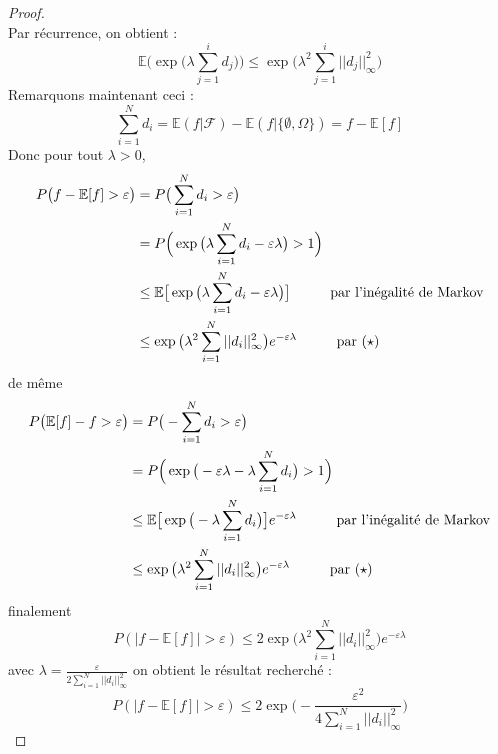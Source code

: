 \documentclass[12pt]{article}
\theoremstyle{definition}
\begin{document}
\begin{proof}
\begin{equation*}
	\end{equation*}
	Par récurrence, on obtient :
	\begin{equation*}\tag{$\star$}
	\mathbb{E}\Big(\exp\big(\lambda\sum_{j=1}^{i}d_j\big)\Big)\leq \exp\big(\lambda^2 \sum_{j=1}^{i}||d_j||_{\infty}^2\big)
	\end{equation*}
	Remarquons maintenant ceci : 
	\begin{equation*}
		\sum_{i=1}^{N}d_i = \mathbb{E}(f|\mathcal{F})-\mathbb{E}(f|\{\emptyset,\Omega\})=f-\mathbb{E}[f]
	\end{equation*}
	Donc pour tout $\lambda>0$,
	\begin{align*}
		P\big(f-\mathbb{E}[f]>\varepsilon\big)&=P\big(\sum_{i=1}^{N}d_i>\varepsilon\big)\\
		&=P\Big(\exp\big(\lambda\sum_{i=1}^{N}d_i-\varepsilon\lambda\big)>1\Big)\\
		&\leq \mathbb{E}\big[\exp\big(\lambda\sum_{i=1}^{N}d_i-\varepsilon\lambda\big)\big] \hspace{10mm} \text{par l'inégalité de Markov}\\
		&\leq \exp\big(\lambda^2 \sum_{i=1}^{N}||d_i||_{\infty}^2\big)e^{-\varepsilon\lambda}\hspace{10mm} \text{par ($\star$)}\\
	\end{align*}
	de même 
	\begin{align*}
		P\big(\mathbb{E}[f]-f>\varepsilon\big)&=P\big(-\sum_{i=1}^{N}d_i>\varepsilon\big)\\
		&=P\Big(\exp\big(-\varepsilon\lambda-\lambda\sum_{i=1}^{N}d_i\big)>1\Big)\\
		&\leq \mathbb{E}\big[\exp\big(-\lambda\sum_{i=1}^{N}d_i\big)\big]e^{-\varepsilon\lambda} \hspace{10mm} \text{par l'inégalité de Markov}\\
		&\leq \exp\big(\lambda^2 \sum_{i=1}^{N}||d_i||_{\infty}^2\big)e^{-\varepsilon\lambda}\hspace{10mm} \text{par ($\star$)} \\
	\end{align*}
	finalement 
	\begin{equation*}
		P(|f-\mathbb{E}[f]|>\varepsilon)\leq 2\exp\big(\lambda^2 \sum_{i=1}^{N}||d_i||_{\infty}^2\big)e^{-\varepsilon\lambda}
	\end{equation*}
	avec $\lambda =\frac{\varepsilon}{2\sum_{i=1}^{N}||d_i||_\infty^2}$ on obtient le résultat recherché :
	\begin{equation*}
		P(|f-\mathbb{E}[f]|>\varepsilon)\leq 2\exp\big(- \frac{\varepsilon^2}{4\sum_{i=1}^{N}||d_i||_{\infty}^2}\big)
	\end{equation*}
\end{proof}
\end{document}
